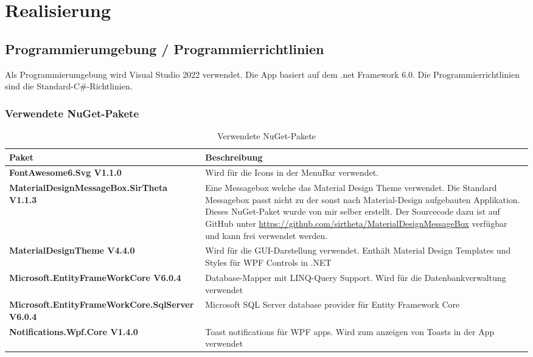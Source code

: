\section{Realisierung}

\subsection{Programmierumgebung / Programmierrichtlinien}
Als Programmierumgebung wird Visual Studio 2022 verwendet. Die App basiert auf dem .net Framework 6.0. Die Programmierrichtlinien sind die Standard-C\#-Richtlinien.
\subsubsection{Verwendete NuGet-Pakete}
\begin{table}[H]
  \centering
  \setlength\extrarowheight{2pt}
    \begin{tabulary}{1.0\textwidth}{|L|m{10cm}|}
      \hline
      \textbf{Paket}& \textbf{Beschreibung}\\
    \hline
    \textbf{FontAwesome6.Svg V1.1.0} & Wird für die Icons in der MenuBar verwendet.\\
    \hline
    \textbf{MaterialDesignMessageBox.SirTheta V1.1.3} & Eine Messagebox welche das Material Design Theme verwendet. Die Standard Messagebox passt nicht zu der sonst nach Material-Design aufgebauten Applikation. Dieses NuGet-Paket wurde von mir selber erstellt. Der Sourcecode dazu ist auf GitHub unter \href{https://github.com/sirtheta/MaterialDesignMessageBox}{https://github.com/sirtheta/MaterialDesignMessageBox} verfügbar und kann frei verwendet werden.\\
    \hline
    \textbf{MaterialDesignTheme V4.4.0} & Wird für die GUI-Darstellung verwendet. Enthält Material Design Templates und Styles für WPF Controls in .NET\\
    \hline
    \textbf{Microsoft.EntityFrameWorkCore V6.0.4} & Database-Mapper mit LINQ-Query Support. Wird für die Datenbankverwaltung verwendet\\
    \hline
    \textbf{Microsoft.EntityFrameWorkCore.SqlServer V6.0.4} & Microsoft SQL Server database provider für Entity Framework Core\\
    \hline
    \textbf{Notifications.Wpf.Core V1.4.0} & Toast notifications für WPF apps. Wird zum anzeigen von Toasts in der App verwendet \\
    \hline
\end{tabulary}
\caption{Verwendete NuGet-Pakete}
\end{table}

